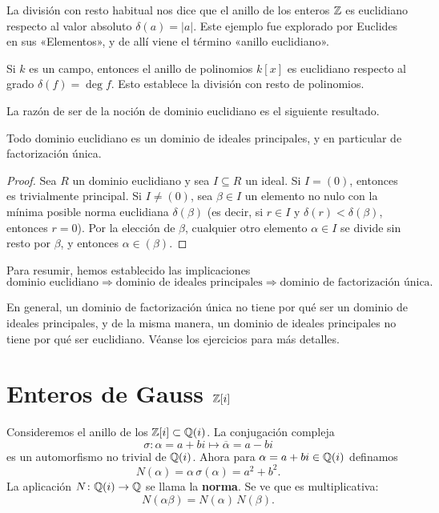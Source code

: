 \begin{ejemplo}
  La división con resto habitual nos dice que el anillo de los enteros $\mathbb{Z}$ es
  euclidiano respecto al valor absoluto $\delta (a) = |a|$. Este ejemplo fue
  explorado por Euclides en sus «Elementos», y de allí viene el término
  «anillo euclidiano».

  Si $k$ es un campo, entonces el anillo de polinomios $k [x]$ es euclidiano
  respecto al grado $\delta (f) = \deg f$. Esto establece la división con resto
  de polinomios.
\end{ejemplo}

La razón de ser de la noción de dominio euclidiano es el siguiente resultado.

\begin{teorema}
  Todo dominio euclidiano es un dominio de ideales principales, y en particular
  de factorización única.

\begin{proof}
  Sea $R$ un dominio euclidiano y sea $I \subseteq R$ un ideal. Si $I = (0)$,
  entonces es trivialmente principal. Si $I \ne (0)$, sea $\beta\in I$ un
  elemento no nulo con la mínima posible norma euclidiana $\delta (\beta)$
  (es decir, si $r \in I$ y $\delta (r) < \delta (\beta)$, entonces $r = 0$).
  Por la elección de $\beta$, cualquier otro elemento $\alpha \in I$ se divide
  sin resto por $\beta$, y entonces $\alpha \in (\beta)$.
\end{proof}
\end{teorema}

Para resumir, hemos establecido las implicaciones
\[ \text{dominio euclidiano} \Longrightarrow
   \text{dominio de ideales principales} \Longrightarrow
   \text{dominio de factorización única}. \]

En general, un dominio de factorización única no tiene por qué ser un
dominio de ideales principales, y de la misma manera, un dominio de ideales
principales no tiene por qué ser euclidiano. Véanse los ejercicios para
más detalles.


\section{Enteros de Gauss \texorpdfstring{$\mathbb{Z} [i]$}{ℤ[i]}}

Consideremos el anillo de los 
$\mathbb{Z} [i] \subset \mathbb{Q} (i)$. La conjugación compleja
$$\sigma\colon \alpha = a + bi \mapsto \overline{\alpha} = a - bi$$
es un automorfismo no trivial de $\mathbb{Q} (i)$. Ahora para
$\alpha = a + bi \in \mathbb{Q} (i)$ definamos
$$N (\alpha) = \alpha \, \sigma (\alpha) = a^2 + b^2.$$
La aplicación $N\colon \mathbb{Q} (i) \to \mathbb{Q}$ se llama la \textbf{norma}.
Se ve que es multiplicativa:
$$N (\alpha\beta) = N (\alpha) \, N (\beta).$$

